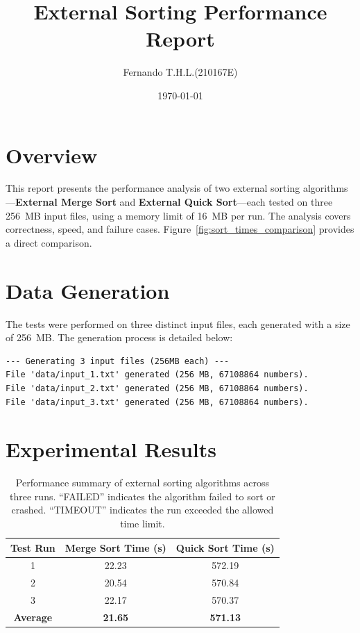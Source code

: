 \documentclass{article}
\title{External Sorting Performance Report}
\author{Fernando T.H.L.(210167E)}
\date{\today}
\begin{document}
\maketitle

\section*{Overview}
This report presents the performance analysis of two external sorting algorithms---\textbf{External Merge Sort} and \textbf{External Quick Sort}---each tested on three 256~MB input files, using a memory limit of 16~MB per run. The analysis covers correctness, speed, and failure cases. Figure~\ref{fig:sort_times_comparison} provides a direct comparison.

\section*{Data Generation}
The tests were performed on three distinct input files, each generated with a size of 256~MB. The generation process is detailed below:
\begin{verbatim}
--- Generating 3 input files (256MB each) ---
File 'data/input_1.txt' generated (256 MB, 67108864 numbers).
File 'data/input_2.txt' generated (256 MB, 67108864 numbers).
File 'data/input_3.txt' generated (256 MB, 67108864 numbers).
\end{verbatim}

\section*{Experimental Results}
\begin{table}[h!]
\centering
\begin{tabular}{c c c}
\toprule
Test Run & Merge Sort Time (s) & Quick Sort Time (s) \\
\midrule
1 & 22.23 & 572.19 \\
2 & 20.54 & 570.84 \\
3 & 22.17 & 570.37 \\
\midrule
\textbf{Average} & \textbf{21.65} & \textbf{571.13} \\
\bottomrule
\end{tabular}
\caption{Performance summary of external sorting algorithms across three runs. ``FAILED'' indicates the algorithm failed to sort or crashed. ``TIMEOUT'' indicates the run exceeded the allowed time limit.}
\label{tab:perf_summary}
\end{table}
\end{document}
